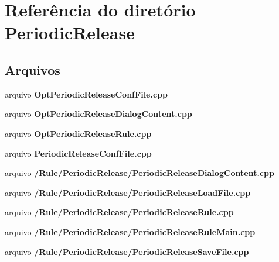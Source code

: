 \section{Referência do diretório Periodic\+Release}
\label{dir_f0ec97d67a26ad123307f16086270d3c}
\subsection*{Arquivos}
\begin{DoxyCompactItemize}
\item 
arquivo {\bf Opt\+Periodic\+Release\+Conf\+File.\+cpp}
\item 
arquivo {\bf Opt\+Periodic\+Release\+Dialog\+Content.\+cpp}
\item 
arquivo {\bf Opt\+Periodic\+Release\+Rule.\+cpp}
\item 
arquivo {\bf Periodic\+Release\+Conf\+File.\+cpp}
\item 
arquivo {\bf /\+Rule/\+Periodic\+Release/\+Periodic\+Release\+Dialog\+Content.\+cpp}
\item 
arquivo {\bf /\+Rule/\+Periodic\+Release/\+Periodic\+Release\+Load\+File.\+cpp}
\item 
arquivo {\bf /\+Rule/\+Periodic\+Release/\+Periodic\+Release\+Rule.\+cpp}
\item 
arquivo {\bf /\+Rule/\+Periodic\+Release/\+Periodic\+Release\+Rule\+Main.\+cpp}
\item 
arquivo {\bf /\+Rule/\+Periodic\+Release/\+Periodic\+Release\+Save\+File.\+cpp}
\end{DoxyCompactItemize}
